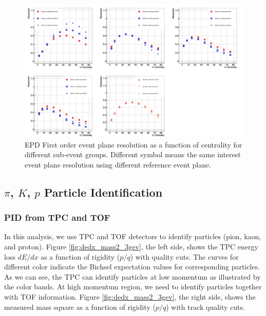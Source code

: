 \begin{figure}[ht]
\includegraphics[scale=0.4]{chapter2/fig/epd_1stresolution.png}
\caption{ EPD First order event plane resolution as a function of centrality for different sub-event groups. Different symbol means the same interest event plane resolution using different reference event plane.}
\label{fig:epd_1stres}
\end{figure}



\subsection{$\pi$, $K$, $p$ Particle Identification}
\subsubsection{PID from TPC and TOF}
In this analysis, we use TPC and TOF detectors to identify particles (pion, kaon, and proton). Figure \ref{fig:dedx_mass2_3gev}, the left side, shows the TPC energy loss $dE/dx$ as a function of rigidity ($p/q$) with quality cuts. The curves for different color indicate the Bichsel expectation values for corresponding particles. As we can see, the TPC can identify particles at low momentum as illustrated by the color bands. At high momentum region, we need to identify particles together with TOF information. Figure \ref{fig:dedx_mass2_3gev}, the right side, shows the measured mass square as a function of rigidity ($p/q$) with track quality cuts. 

